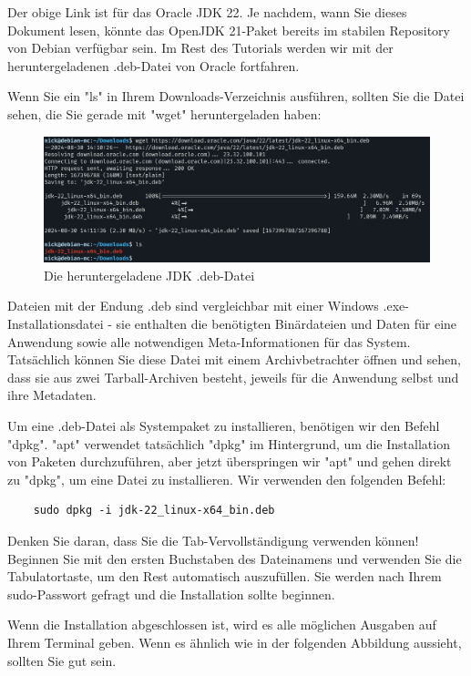 \documentclass[]{article}
\begin{document}
Der obige Link ist für das Oracle JDK 22. Je nachdem, wann Sie dieses Dokument lesen, könnte das OpenJDK 21-Paket bereits im stabilen Repository von Debian verfügbar sein. Im Rest des Tutorials werden wir mit der heruntergeladenen .deb-Datei von Oracle fortfahren.

Wenn Sie ein "ls" in Ihrem Downloads-Verzeichnis ausführen, sollten Sie die Datei sehen, die Sie gerade mit "wget" heruntergeladen haben:

\begin{figure}[h!]
	\caption{Die heruntergeladene JDK .deb-Datei}
	\centering
	\includegraphics[width=1\textwidth]{wget}
\end{figure}
\FloatBarrier

Dateien mit der Endung .deb sind vergleichbar mit einer Windows .exe-Installationsdatei - sie enthalten die benötigten Binärdateien und Daten für eine Anwendung sowie alle notwendigen Meta-Informationen für das System. Tatsächlich können Sie diese Datei mit einem Archivbetrachter öffnen und sehen, dass sie aus zwei Tarball-Archiven besteht, jeweils für die Anwendung selbst und ihre Metadaten.

Um eine .deb-Datei als Systempaket zu installieren, benötigen wir den Befehl "dpkg". "apt" verwendet tatsächlich "dpkg" im Hintergrund, um die Installation von Paketen durchzuführen, aber jetzt überspringen wir "apt" und gehen direkt zu "dpkg", um eine Datei zu installieren. Wir verwenden den folgenden Befehl:

\begin{verbatim}
	sudo dpkg -i jdk-22_linux-x64_bin.deb
\end{verbatim}

Denken Sie daran, dass Sie die Tab-Vervollständigung verwenden können! Beginnen Sie mit den ersten Buchstaben des Dateinamens und verwenden Sie die Tabulatortaste, um den Rest automatisch auszufüllen. Sie werden nach Ihrem sudo-Passwort gefragt und die Installation sollte beginnen.

Wenn die Installation abgeschlossen ist, wird es alle möglichen Ausgaben auf Ihrem Terminal geben. Wenn es ähnlich wie in der folgenden Abbildung aussieht, sollten Sie gut sein.
\end{document}
